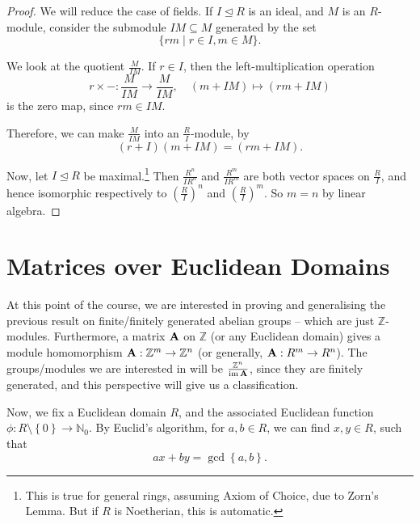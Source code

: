 \documentclass{article}
\theoremstyle{definition}
\theoremstyle{remark}
\newcommand{\pqty}[1]{\left(#1\right)}
\newcommand{\Bqty}[1]{\left\{#1\right\}}
\newcommand{\set}[2]{\{#1\mid #2\}}
\newcommand{\flatfrac}[2]{\frac{#1}{#2}}
\newcommand{\functiondomain}[3]{#1:#2\to #3}
\newcommand{\function}[5]{#1:#2\to #3,\quad #4\mapsto #5}
\newcommand{\submodule}{\subseteq}
\newcommand{\idealsub}{\trianglelefteq}
\newcommand{\ZZ}{\mathbb{Z}}
\newcommand{\NN}{\mathbb{N}}
\newcommand{\img}{\operatorname{im}}
\begin{document}
\begin{proof}
    We will reduce the case of fields. If \(I \idealsub R\) is an ideal, and \(M\) is an \(R\)-module, consider the submodule \(IM \submodule M\) generated by the set
    \[
        \set{rm}{r \in I, m \in M}.
    \]
    
    We look at the quotient \(\flatfrac{M}{IM}\). If \(r \in I\), then the left-multiplication operation
    \[
        \function{r \times -}{\flatfrac{M}{IM}}{\flatfrac{M}{IM}}{\pqty{m + IM}}{\pqty{rm + IM}}
    \]
    is the zero map, since \(rm \in IM\).

    Therefore, we can make \(\flatfrac{M}{IM}\) into an \(\flatfrac{R}{I}\)-module, by
    \[
        \pqty{r + I} \pqty{m + IM} = \pqty{rm + IM}.
    \]

    Now, let \(I \idealsub R\) be maximal.\footnote{This is true for general rings, assuming Axiom of Choice, due to Zorn's Lemma. But if \(R\) is Noetherian, this is automatic.} Then \(\flatfrac{R^n}{I R^n}\) and \(\flatfrac{R^m}{I R^m}\) are both vector spaces on \(\flatfrac{R}{I}\), and hence isomorphic respectively to \(\pqty{\flatfrac{R}{I}}^n\) and \(\pqty{\flatfrac{R}{I}}^m\). So \(m = n\) by linear algebra.
\end{proof}

\section{Matrices over Euclidean Domains}

At this point of the course, we are interested in proving and generalising the previous result on finite/finitely generated abelian groups -- which are just \(\ZZ\)-modules. Furthermore, a matrix \(\vb{A}\) on \(\ZZ\) (or any Euclidean domain) gives a module homomorphism \(\functiondomain{\vb{A}}{\ZZ^m}{\ZZ^n}\) (or generally, \(\functiondomain{\vb{A}}{R^m}{R^n}\)). The groups/modules we are interested in will be \(\flatfrac{\ZZ^n}{\img \vb{A}}\), since they are finitely generated, and this perspective will give us a classification.

Now, we fix a Euclidean domain \(R\), and the associated Euclidean function \(\functiondomain{\phi}{R \setminus \Bqty{0}}{\NN_0}\). By Euclid's algorithm, for \(a, b \in R\), we can find \(x, y \in R\), such that
\[
    ax + by = \gcd\Bqty{a, b}.
\]

\setcounter{MaxMatrixCols}{20}
\end{document}
